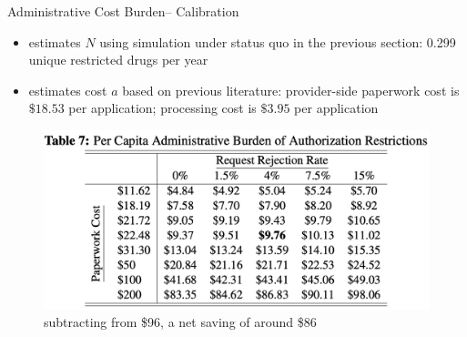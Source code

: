 \begin{frame}{Administrative Cost Burden-- Calibration}
    \begin{itemize}
        \item estimates $N$ using simulation under status quo in the previous section: 0.299 unique restricted drugs per year
        \item estimates cost $a$ based on previous literature: provider-side paperwork cost is $\$ 18.53$ per application; processing cost is $\$ 3.95$ per application 
    \end{itemize}
    \begin{figure}
        \centering
        \includegraphics[width=0.7\linewidth]{tb7-admin-cost.png}
        \caption{subtracting from \$96, a net saving of around \$86 }
    \end{figure}
\end{frame}